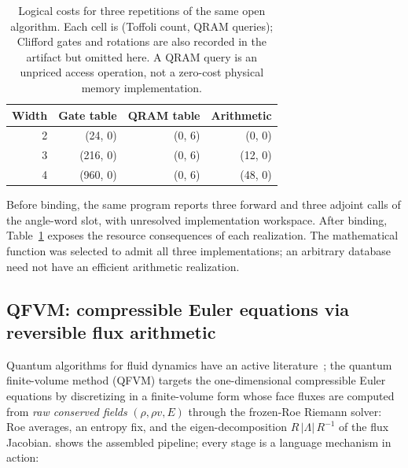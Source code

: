 \begin{table}[t]
\centering
\caption{Logical costs for three repetitions of the same open algorithm.
Each cell is (Toffoli count, QRAM queries); Clifford gates and rotations
are also recorded in the artifact but omitted here. A QRAM query is an
unpriced access operation, not a zero-cost physical memory implementation.}
\label{tab:oracle-study}
\begin{tabular}{@{}rrrr@{}}
\toprule
Width & Gate table & QRAM table & Arithmetic \\
\midrule
2 & (24, 0) & (0, 6) & (0, 0) \\
3 & (216, 0) & (0, 6) & (12, 0) \\
4 & (960, 0) & (0, 6) & (48, 0) \\
\bottomrule
\end{tabular}
\end{table}

Before binding, the same program reports three forward and three adjoint
calls of the angle-word slot, with unresolved implementation workspace.
After binding, Table~\ref{tab:oracle-study} exposes the resource
consequences of each realization. The mathematical function was selected
to admit all three implementations; an arbitrary database need not have
an efficient arithmetic realization.

\subsection{QFVM: compressible Euler equations via reversible flux arithmetic}
\label{sec:qfvm}

Quantum algorithms for fluid dynamics have an active literature~\cite{meng2023fluid,bharadwaj2025fluid}; the quantum finite-volume method (QFVM) targets the one-dimensional
compressible Euler equations by discretizing in a finite-volume form whose
face fluxes are computed from \emph{raw conserved fields} $(\rho, \rho v, E)$
through the frozen-Roe Riemann solver: Roe averages, an entropy fix, and the
eigen-decomposition $R\,|\Lambda|\,R^{-1}$ of the flux Jacobian.
 shows the assembled pipeline; every stage is a language
mechanism in action:


